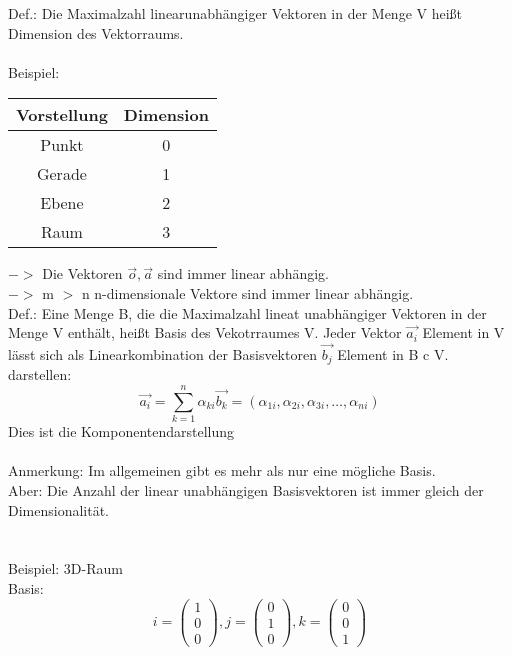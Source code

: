 \documentclass{article}
\begin{document}
Def.: Die Maximalzahl linearunabhängiger Vektoren in der Menge V heißt Dimension des Vektorraums.\\
\\
Beispiel:\\
\begin{center}
    \begin{tabular}{c c} 
     \hline
     Vorstellung & Dimension \\ 
     \hline
     Punkt & 0\\ 
     Gerade & 1 \\ 
     Ebene & 2\\
     Raum & 3\\
     \hline
    \end{tabular}
    \end{center}
$->$ Die Vektoren ${\vec{o},\vec{a}}$ sind immer linear abhängig.\\
$->$ m $>$ n n-dimensionale Vektore sind immer linear abhängig.\\
Def.: Eine Menge B, die die Maximalzahl lineat unabhängiger Vektoren in der Menge V enthält, heißt Basis des Vekotrraumes V. Jeder Vektor $\vec{a_i}$ Element in V lässt sich als Linearkombination der Basisvektoren $\vec{b_j}$ Element in B c V. darstellen:\\
\begin{equation*}
    \vec{a_i}=\sum_{k=1}^{n}\alpha_{ki} \vec{b_k} = \left(\alpha_{1i},\alpha_{2i},\alpha_{3i},\dots,\alpha_{ni}\right)
\end{equation*}
Dies ist die Komponentendarstellung\\
\\
Anmerkung: Im allgemeinen gibt es mehr als nur eine mögliche Basis.\\Aber: Die Anzahl der linear unabhängigen Basisvektoren ist immer gleich der Dimensionalität.\\
\\
\\
Beispiel: 3D-Raum\\
Basis:\\
\begin{equation*}
    i = \left(\begin{array}{c}
        1 \\ 0 \\ 0
    \end{array}\right), j = \left(\begin{array}{c}
        0 \\ 1 \\ 0
    \end{array}\right), k = \left(\begin{array}{c}
        0 \\ 0 \\ 1
    \end{array}\right)
\end{equation*}
\end{document}
